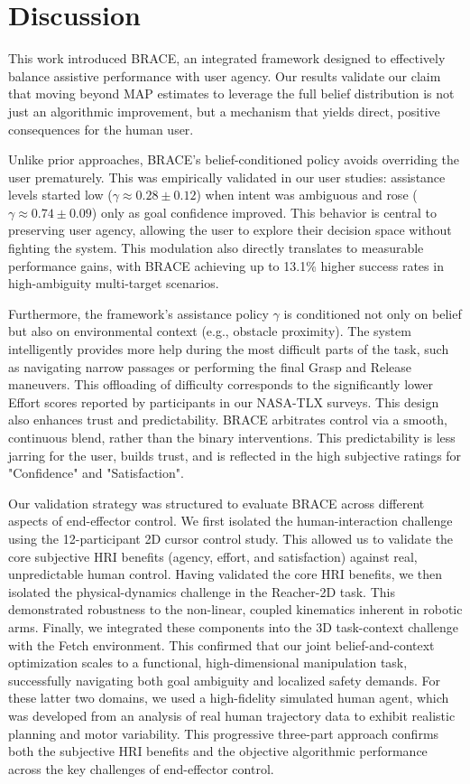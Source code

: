 \documentclass[11pt]{article}
\begin{document}
\section{Discussion}

This work introduced BRACE, an integrated framework designed to effectively balance assistive performance with user agency. Our results validate our claim that moving beyond MAP estimates to leverage the full belief distribution is not just an algorithmic improvement, but a mechanism that yields direct, positive consequences for the human user.

Unlike prior approaches, BRACE's belief-conditioned policy avoids overriding the user prematurely. This was empirically validated in our user studies: assistance levels started low ($\gamma \approx 0.28 \pm 0.12$) when intent was ambiguous and rose ($\gamma \approx 0.74 \pm 0.09$) only as goal confidence improved. This behavior is central to preserving user agency, allowing the user to explore their decision space without fighting the system. This modulation also directly translates to measurable performance gains, with BRACE achieving up to 13.1\% higher success rates in high-ambiguity multi-target scenarios.

Furthermore, the framework's assistance policy $\gamma$ is conditioned not only on belief but also on environmental context (e.g., obstacle proximity). The system intelligently provides more help during the most difficult parts of the task, such as navigating narrow passages or performing the final Grasp and Release maneuvers. This offloading of difficulty corresponds to the significantly lower Effort scores reported by participants in our NASA-TLX surveys. This design also enhances trust and predictability. BRACE arbitrates control via a smooth, continuous blend, rather than the binary interventions. This predictability is less jarring for the user, builds trust, and is reflected in the high subjective ratings for "Confidence" and "Satisfaction".

Our validation strategy was structured to evaluate BRACE across different aspects of end-effector control. We first isolated the human-interaction challenge using the 12-participant 2D cursor control study. This allowed us to validate the core subjective HRI benefits (agency, effort, and satisfaction) against real, unpredictable human control. Having validated the core HRI benefits, we then isolated the physical-dynamics challenge in the Reacher-2D task. This demonstrated robustness to the non-linear, coupled kinematics inherent in robotic arms. Finally, we integrated these components into the 3D task-context challenge with the Fetch environment. This confirmed that our joint belief-and-context optimization scales to a functional, high-dimensional manipulation task, successfully navigating both goal ambiguity and localized safety demands. For these latter two domains, we used a high-fidelity simulated human agent, which was developed from an analysis of real human trajectory data to exhibit realistic planning and motor variability. This progressive three-part approach confirms both the subjective HRI benefits and the objective algorithmic performance across the key challenges of end-effector control.
\end{document}
